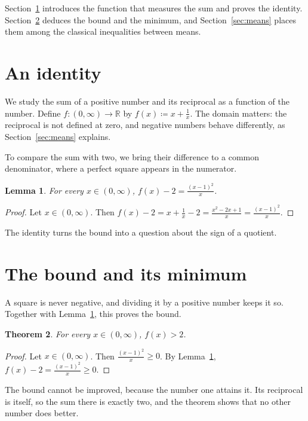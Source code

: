 \documentclass{article}
\newtheorem{lemma}{Lemma}[section]
\newtheorem{theorem}[lemma]{Theorem}
\begin{document}
Section~\ref{sec:identity} introduces the function that measures the sum and proves the identity.
Section~\ref{sec:bound} deduces the bound and the minimum, and Section~\ref{sec:means} places them among the classical inequalities between means.

\section{An identity}\label{sec:identity}

We study the sum of a positive number and its reciprocal as a function of the number.
Define $f:(0,\infty)\to\mathbb{R}$ by $f(x)\coloneqq x+\frac1x$.
The domain matters: the reciprocal is not defined at zero, and negative numbers behave differently, as Section~\ref{sec:means} explains.

To compare the sum with two, we bring their difference to a common denominator, where a perfect square appears in the numerator.

\begin{lemma}\label{lem:identity}
For every $x\in(0,\infty)$, $f(x)-2=\frac{(x-1)^2}{x}$.
\end{lemma}

\begin{proof}
Let $x\in(0,\infty)$.
Then $f(x)-2=x+\frac1x-2=\frac{x^2-2x+1}{x}=\frac{(x-1)^2}{x}$.
\end{proof}

The identity turns the bound into a question about the sign of a quotient.

\section{The bound and its minimum}\label{sec:bound}

A square is never negative, and dividing it by a positive number keeps it so.
Together with Lemma~\ref{lem:identity}, this proves the bound.

\begin{theorem}\label{thm:bound}
For every $x\in(0,\infty)$, $f(x)>2$.
\end{theorem}

\begin{proof}
Let $x\in(0,\infty)$.
Then $\frac{(x-1)^2}{x}\ge0$.
By Lemma~\ref{lem:identity}, $f(x)-2=\frac{(x-1)^2}{x}\ge0$.
\end{proof}

The bound cannot be improved, because the number one attains it.
Its reciprocal is itself, so the sum there is exactly two, and the theorem shows that no other number does better.
\end{document}
